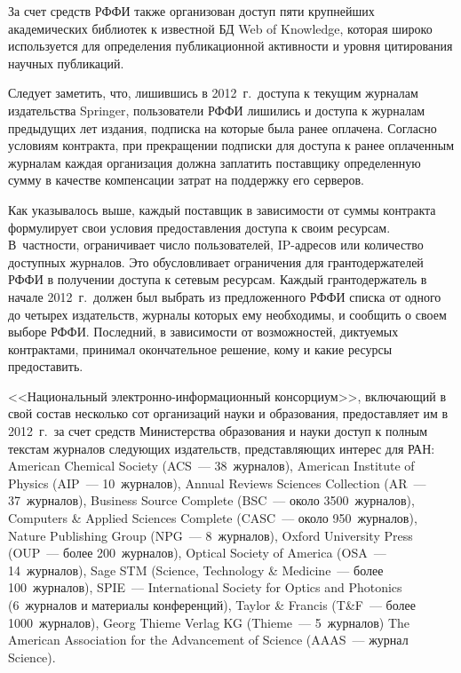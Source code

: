 \begin{multicols}{2}
     За счет средств РФФИ также организован доступ пяти крупнейших 
академических биб\-лио\-тек к известной БД Web of Knowledge, которая широко 
используется для определения публикационной активности и уровня 
цитирования научных публикаций.
     
     Следует заметить, что, лишившись в 2012~г.\ доступа к текущим 
журналам издательства Springer, пользователи РФФИ лишились и доступа к 
журналам предыдущих лет издания, подписка на которые была ранее 
оплачена. Согласно условиям контракта, при прекращении подписки для 
доступа к ранее оплаченным журналам каждая организация должна 
заплатить поставщику определенную сумму в качестве компенсации затрат 
на поддержку его серверов. 
     
     Как указывалось выше, каждый поставщик в зависимости от суммы 
контракта формулирует свои условия предоставления доступа к своим 
ресурсам. В~частности, ограничивает число пользователей, IP-ад\-ре\-сов или 
количество доступных журналов. Это обусловливает ограничения для 
грантодержателей \mbox{РФФИ} в получении доступа к сетевым ресурсам. Каж\-дый 
грантодержатель в начале 2012~г.\ должен был выбрать из предложенного 
\mbox{РФФИ} списка от одного до четырех издательств, журналы которых ему 
необходимы, и сообщить о своем выборе \mbox{РФФИ}. Последний, в зависимости 
от возможностей, диктуемых контрактами, принимал окончательное 
решение, кому и какие ресурсы предоставить. 
     
     <<Национальный электронно-информационный консорциум>>, 
     включающий в свой состав несколько сот организаций 
науки и образования, предо\-став\-ля\-ет им в 2012~г.\ за счет средств 
Министерства образования и науки доступ к полным текстам журналов 
следующих издательств, представляющих интерес для РАН: American 
Chemical Society (ACS~--- 38~журналов), American Institute of Physics 
     (AIP~--- 10~журналов), Annual Reviews Sciences Collection (AR~--- 
37~журналов), Business Source Complete (BSC~--- около 3500~журналов), 
Computers \& Applied Sciences Complete (CASC~--- около 950~журналов), 
Nature Publishing Group (NPG~--- 8~журналов), Oxford University Press 
(OUP~--- более 200~журналов), Optical Society of America (OSA~--- 
14~журналов), Sage STM (Science, Technology \& Medicine~--- более 
100~журналов), SPIE~--- International Society for Optics and Photonics 
(6~журналов и материалы конференций), Taylor \& Francis (T\&F~--- более 
1000~журналов), Georg Thieme Verlag KG (Thieme~--- 5~журналов) The 
American Association for the Advancement of Science (AAAS~--- журнал 
Science).
     

\end{multicols}
